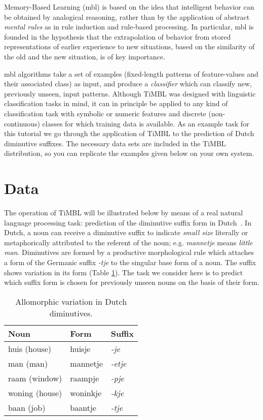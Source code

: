 \documentclass{report}
\begin{document}
Memory-Based Learning ({\sc mbl}) is based on the idea that
intelligent behavior can be obtained by analogical reasoning, rather
than by the application of abstract {\em mental rules} as in rule
induction and rule-based processing. In particular, {\sc mbl} is
founded in the hypothesis that the extrapolation of behavior from
stored representations of earlier experience to new situations, based
on the similarity of the old and the new situation, is of key
importance.

{\sc mbl} algorithms take a set of examples (fixed-length patterns of
feature-values and their associated class) as input, and produce a
{\em classifier} which can classify new, previously unseen, input
patterns. Although TiMBL was designed with linguistic classification
tasks in mind, it can in principle be applied to any kind of
classification task with symbolic or numeric features and discrete
(non-continuous) classes for which training data is available. As an
example task for this tutorial we go through the application of TiMBL
to the prediction of Dutch diminutive suffixes. The necessary data
sets are included in the TiMBL distribution, so you can replicate the
examples given below on your own system.

\section{Data}

The operation of TiMBL will be illustrated below by means of a real
natural language processing task: prediction of the diminutive suffix
form in Dutch~\cite{Daelemans+97e}. In Dutch, a noun can receive a
diminutive suffix to indicate {\em small size} literally or
metaphorically attributed to the referent of the noun; e.g. {\em
mannetje} means {\em little man}. Diminutives are formed by a
productive morphological rule which attaches a form of the Germanic
suffix {\em -tje} to the singular base form of a noun. The suffix
shows variation in its form (Table \ref{variation}). The task we
consider here is to predict which suffix form is chosen for previously
unseen nouns on the basis of their form.

\begin{table}[h]
\begin{center}
\begin{tabular}{l|l|l}
Noun & Form & Suffix \\
\hline
huis (house) & huisje & {\em -je} \\
man (man) & mannetje & {\em -etje\/} \\
raam (window) & raampje & {\em -pje\/} \\
woning (house) & woninkje & {\em -kje\/} \\
baan (job) & baantje & {\em -tje\/} \\
\end{tabular}
\caption{Allomorphic variation in Dutch diminutives.}\label{variation}
\end{center}
\end{table}
\end{document}
